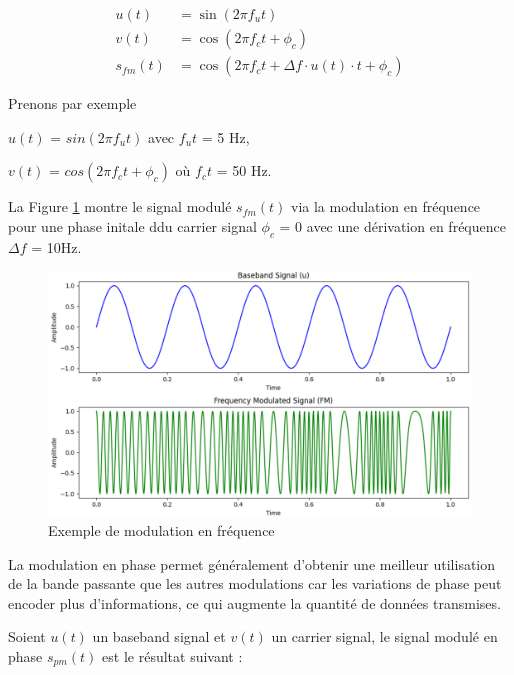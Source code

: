 \begin{align}
    u(t) &= \sin(2\pi f_{u}t) \\
    v(t) &= \cos(2\pi f_{c}t + \phi_{c}) \\
    s_{fm}(t) &= \cos\left(2\pi f_{c}t + \Delta f \cdot u(t) \cdot t + \phi_{c}\right)
\end{align}

\vspace{0.1cm}

Prenons par exemple

\vspace{0.1cm}

$u(t)$ = $sin(2\pi f_{u}t)$ avec $f_{u}t$ = 5 Hz,

$v(t)$ = $cos(2\pi f_{c}t + \phi_{c})$ où $f_{c}t$ = 50 Hz.

\vspace{0.1cm}

La Figure \ref{term2} montre le signal modulé $s_{fm}(t)$ via la modulation en fréquence pour une phase initale ddu carrier signal $\phi_{c}$ = 0 avec une dérivation en fréquence $\Delta f$ = 10Hz.

\newpage

\begin{figure}[h]
\centering

\includegraphics[scale=0.5]{images/FM_mod.PNG}
\caption{Exemple de modulation en fréquence}\label{term2}
\end{figure}

La modulation en phase permet généralement d'obtenir une meilleur utilisation de la bande passante que les autres modulations car les variations de phase peut encoder plus d'informations, ce qui augmente la quantité de données transmises.

Soient $u(t)$ un baseband signal et $v(t)$ un carrier signal, le signal modulé en phase $s_{pm}(t)$ est le résultat suivant :


